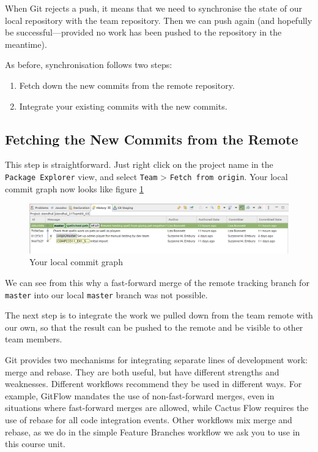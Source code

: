 \documentclass[
]{book}
\providecommand{\tightlist}{%
  \setlength{\itemsep}{0pt}\setlength{\parskip}{0pt}}
\begin{document}
When Git rejects a push, it means that we need to synchronise the state of our local repository with the team repository. Then we can push again (and hopefully be successful---provided no work has been pushed to the repository in the meantime).

As before, synchronisation follows two steps:

\begin{enumerate}
\def\labelenumi{\arabic{enumi}.}
\tightlist
\item
  Fetch down the new commits from the remote repository.
\item
  Integrate your existing commits with the new commits.
\end{enumerate}

\hypertarget{fetchingr}{%
\subsection{Fetching the New Commits from the Remote}\label{fetchingr}}

This step is straightforward. Just right click on the project name in the \texttt{Package\ Explorer} view, and select \texttt{Team} \textgreater{} \texttt{Fetch\ from\ origin}. Your local commit graph now looks like figure \ref{fig:localCommitGraphAfterPushRejectedAndFetchNoHistoryb-fig}

\begin{figure}

{\centering \includegraphics[width=1\linewidth]{images/localCommitGraphAfterPushRejectedAndFetchNoHistory} 

}

\caption{Your local commit graph}\label{fig:localCommitGraphAfterPushRejectedAndFetchNoHistoryb-fig}
\end{figure}

We can see from this why a fast-forward merge of the remote tracking branch for \texttt{master} into our local \texttt{master} branch was not possible.

The next step is to integrate the work we pulled down from the team remote with our own, so that the result can be pushed to the remote and be visible to other team members.

Git provides two mechanisms for integrating separate lines of development work: merge and rebase. They are both useful, but have different strengths and weaknesses. Different workflows recommend they be used in different ways. For example, GitFlow mandates the use of non-fast-forward merges, even in situations where fast-forward merges are allowed, while Cactus Flow requires the use of rebase for all code integration events. Other workflows mix merge and rebase, as we do in the simple Feature Branches workflow we ask you to use in this course unit.
\end{document}
